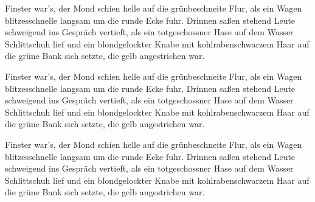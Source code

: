 Finster war's, der Mond schien helle auf die grünbeschneite Flur, als
ein Wagen blitzesschnelle langsam um die runde Ecke fuhr. Drinnen
saßen stehend Leute schweigend ins Gespräch vertieft, als ein
totgeschossner Hase auf dem Wasser Schlittschuh lief und ein
blondgelockter Knabe mit kohlrabenschwarzem Haar auf die grüne Bank
sich setzte, die gelb angestrichen war.

Finster war's, der Mond schien helle auf die grünbeschneite Flur, als
ein Wagen blitzesschnelle langsam um die runde Ecke fuhr. Drinnen
saßen stehend Leute schweigend ins Gespräch vertieft, als ein
totgeschossner Hase auf dem Wasser Schlittschuh lief und ein
blondgelockter Knabe mit kohlrabenschwarzem Haar auf die grüne Bank
sich setzte, die gelb angestrichen war.

Finster war's, der Mond schien helle auf die grünbeschneite Flur, als
ein Wagen blitzesschnelle langsam um die runde Ecke fuhr. Drinnen
saßen stehend Leute schweigend ins Gespräch vertieft, als ein
totgeschossner Hase auf dem Wasser Schlittschuh lief und ein
blondgelockter Knabe mit kohlrabenschwarzem Haar auf die grüne Bank
sich setzte, die gelb angestrichen war.